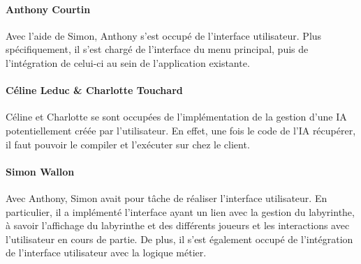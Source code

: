     \paragraph{Anthony Courtin} Avec l'aide de Simon, Anthony s'est occupé de l'interface utilisateur. Plus spécifiquement, il s'est chargé de l'interface du menu principal, puis de l'intégration de celui-ci au sein de l'application existante.

    \paragraph{Céline Leduc \& Charlotte Touchard} Céline et Charlotte se sont occupées de l'implémentation de la gestion d'une IA potentiellement créée par l'utilisateur. En effet, une fois le code de l'IA récupérer, il faut pouvoir le compiler et l'exécuter sur chez le client.

    \paragraph{Simon Wallon} Avec Anthony, Simon avait pour tâche de réaliser l'interface utilisateur. En particulier, il a implémenté l'interface ayant un lien avec la gestion du labyrinthe, à savoir l'affichage du labyrinthe et des différents joueurs et les interactions avec l'utilisateur en cours de partie. De plus, il s'est également occupé de l'intégration de l'interface utilisateur avec la logique métier.


